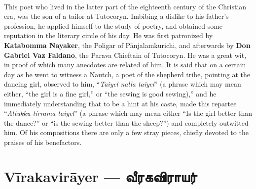 \documentclass{article}
\newcommand{\TamilBold}[1]{\texttamil{\textbf{#1}}}
\newcommand{\tambold}[1]{\TamilBold{#1}}
\begin{document}
\paragraph{}
This poet who lived in the latter part of the eighteenth century of the Christian era, was the son of a tailor at Tutocoryn. Imbibing a dislike to his father's profession, he applied himself to the study of poetry, and obtained some reputation in the literary circle of his day. He was first patronized by \textbf{Katabomma Nayaker}, the Poligar of P\={a}njalamkurichi, and afterwards by \textbf{Don Gabriel Vaz Faldano}, the Parava Chieftain of Tutocoryn. He was a great wit, in proof of which many anecdotes are related of him. It is said that on a certain day as he went to witness a Nautch, a poet of the shepherd tribe, pointing at the dancing girl, observed to him, ``\emph{Taiyel nalla taiyel}'' (a phrase which may mean either, ``the girl is a fine girl,'' or ``the sewing is good sewing),'' and he immediately understanding that to be a hint at his caste, made this repartee ``\emph{Attukku tirrama taiyel}'' (a phrase which may mean either ``Is the girl better than the dance?'' or ``is the sewing better than the sheep?'') and completely outwitted him. Of his compositions there are only a few stray pieces, chiefly devoted to the praises of his benefactors.

\section{V\={i}rakavir\={a}yer --- \tambold{வீரகவிராயர்}}
\end{document}
